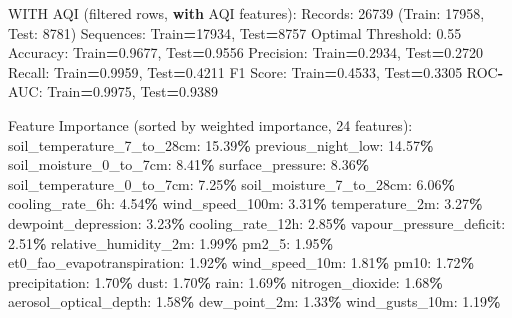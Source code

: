 \documentclass[
  letterpaper,
  DIV=11,
  numbers=noendperiod]{scrartcl}
\newenvironment{Shaded}{\begin{snugshade}}{\end{snugshade}}
\newcommand{\BuiltInTok}[1]{#1}
\newcommand{\ControlFlowTok}[1]{\textcolor[rgb]{0.13,0.29,0.53}{\textbf{#1}}}
\newcommand{\DecValTok}[1]{\textcolor[rgb]{0.00,0.00,0.81}{#1}}
\newcommand{\FloatTok}[1]{\textcolor[rgb]{0.00,0.00,0.81}{#1}}
\newcommand{\NormalTok}[1]{#1}
\newcommand{\OperatorTok}[1]{\textcolor[rgb]{0.81,0.36,0.00}{\textbf{#1}}}
\begin{document}
\begin{Shaded}
\begin{Highlighting}[]
\NormalTok{WITH AQI (filtered rows, }\ControlFlowTok{with}\NormalTok{ AQI features):}
\NormalTok{  Records: }\DecValTok{26739}\NormalTok{ (Train: }\DecValTok{17958}\NormalTok{, Test: }\DecValTok{8781}\NormalTok{)}
\NormalTok{  Sequences: Train}\OperatorTok{=}\DecValTok{17934}\NormalTok{, Test}\OperatorTok{=}\DecValTok{8757}
\NormalTok{  Optimal Threshold: }\FloatTok{0.55}
\NormalTok{  Accuracy: Train}\OperatorTok{=}\FloatTok{0.9677}\NormalTok{, Test}\OperatorTok{=}\FloatTok{0.9556}
\NormalTok{  Precision: Train}\OperatorTok{=}\FloatTok{0.2934}\NormalTok{, Test}\OperatorTok{=}\FloatTok{0.2720}
\NormalTok{  Recall: Train}\OperatorTok{=}\FloatTok{0.9959}\NormalTok{, Test}\OperatorTok{=}\FloatTok{0.4211}
\NormalTok{  F1 Score: Train}\OperatorTok{=}\FloatTok{0.4533}\NormalTok{, Test}\OperatorTok{=}\FloatTok{0.3305}
\NormalTok{  ROC}\OperatorTok{{-}}\NormalTok{AUC: Train}\OperatorTok{=}\FloatTok{0.9975}\NormalTok{, Test}\OperatorTok{=}\FloatTok{0.9389}

\NormalTok{  Feature Importance (}\BuiltInTok{sorted}\NormalTok{ by weighted importance, }\DecValTok{24}\NormalTok{ features):}
\NormalTok{    soil\_temperature\_7\_to\_28cm: }\FloatTok{15.39}\OperatorTok{\%}
\NormalTok{    previous\_night\_low: }\FloatTok{14.57}\OperatorTok{\%}
\NormalTok{    soil\_moisture\_0\_to\_7cm: }\FloatTok{8.41}\OperatorTok{\%}
\NormalTok{    surface\_pressure: }\FloatTok{8.36}\OperatorTok{\%}
\NormalTok{    soil\_temperature\_0\_to\_7cm: }\FloatTok{7.25}\OperatorTok{\%}
\NormalTok{    soil\_moisture\_7\_to\_28cm: }\FloatTok{6.06}\OperatorTok{\%}
\NormalTok{    cooling\_rate\_6h: }\FloatTok{4.54}\OperatorTok{\%}
\NormalTok{    wind\_speed\_100m: }\FloatTok{3.31}\OperatorTok{\%}
\NormalTok{    temperature\_2m: }\FloatTok{3.27}\OperatorTok{\%}
\NormalTok{    dewpoint\_depression: }\FloatTok{3.23}\OperatorTok{\%}
\NormalTok{    cooling\_rate\_12h: }\FloatTok{2.85}\OperatorTok{\%}
\NormalTok{    vapour\_pressure\_deficit: }\FloatTok{2.51}\OperatorTok{\%}
\NormalTok{    relative\_humidity\_2m: }\FloatTok{1.99}\OperatorTok{\%}
\NormalTok{    pm2\_5: }\FloatTok{1.95}\OperatorTok{\%}
\NormalTok{    et0\_fao\_evapotranspiration: }\FloatTok{1.92}\OperatorTok{\%}
\NormalTok{    wind\_speed\_10m: }\FloatTok{1.81}\OperatorTok{\%}
\NormalTok{    pm10: }\FloatTok{1.72}\OperatorTok{\%}
\NormalTok{    precipitation: }\FloatTok{1.70}\OperatorTok{\%}
\NormalTok{    dust: }\FloatTok{1.70}\OperatorTok{\%}
\NormalTok{    rain: }\FloatTok{1.69}\OperatorTok{\%}
\NormalTok{    nitrogen\_dioxide: }\FloatTok{1.68}\OperatorTok{\%}
\NormalTok{    aerosol\_optical\_depth: }\FloatTok{1.58}\OperatorTok{\%}
\NormalTok{    dew\_point\_2m: }\FloatTok{1.33}\OperatorTok{\%}
\NormalTok{    wind\_gusts\_10m: }\FloatTok{1.19}\OperatorTok{\%}


\end{Highlighting}
\end{Shaded}
\end{document}
